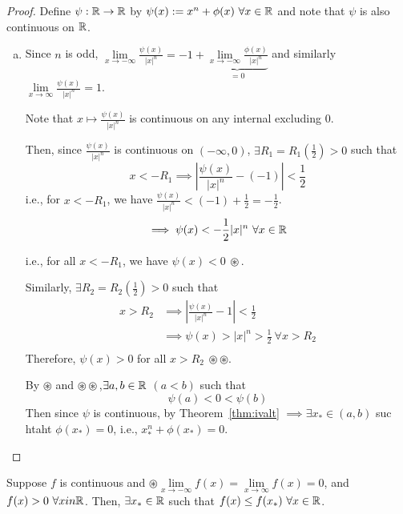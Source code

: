 \begin{proof}
    Define $\psi: \mathbb R \to \mathbb R$ by $\psi(x):= x^n + \phi(x)\ \forall x \in \RR$
    and note that $\psi$ is also continuous on $\mathbb R$.
    \begin{enumerate}[(a)]
        \item Since $n$ is odd, $\lim\limits_{x\to -\infty}\frac{\psi(x)}{|x|^n} = -1 + \underbrace{\lim\limits_{x \to -\infty} \frac{\phi(x)}{|x|^n}}_{=0}$
        and similarly $\lim\limits_{x\to \infty}\frac{\psi(x)}{|x|^n} = 1$.

        Note that $x \mapsto \frac{\psi(x)}{|x|^n}$ is continuous on any internal excluding 0. 

        Then, since $\frac{\psi(x)}{|x|^n}$ is continuous on $(-\infty, 0)$, $\exists R_1 = R_1(\frac{1}{2}) > 0$ such that
        $$x < -R_1 \implies \left|\frac{\psi(x)}{|x|^n} - (-1)\right| < \frac{1}{2}$$
        i.e., for $x < -R_1$, we have $\frac{\psi(x)}{|x|^n} < (-1) + \frac{1}{2} = -\frac{1}{2}$.
        $$\implies \psi(x) < -\frac{1}{2}|x|^n\ \forall x \in \RR$$

        i.e., for all $x < -R_1$, we have $\psi(x) < 0\ \circledast$.

        Similarly, $\exists R_2 = R_2(\frac{1}{2}) > 0$ such that 
        \begin{align*}
            x > R_2 &\implies \left|\frac{\psi(x)}{|x|^n}  - 1\right| < \frac{1}{2} \\
            &\implies \psi(x) > |x|^n > \frac{1}{2}\ \forall x > R_2 \\
        \end{align*}
        Therefore, $\psi(x) > 0$ for all $x > R_2\ \circledast \circledast $.

        By $\circledast$ and $\circledast \circledast$,$\exists a, b \in \mathbb R$ $(a < b)$ such that
        $$\psi(a) < 0 < \psi(b)$$ Then since $\psi$ is continuous, by Theorem~\ref{thm:ivalt}
        $\implies \exists x_* \in (a, b)$ suc htaht $\phi(x_*) = 0$, i.e., $x_*^n + \phi(x_*) = 0$.
    \end{enumerate}
\end{proof}

\begin{example}
    
\end{example}
\begin{example}
    
\end{example}
\begin{example}
    
\end{example}




\begin{example}
    Suppose $f$ is continuous and $\circledast \lim\limits_{x \to -\infty} f(x) = \lim\limits_{x \to \infty} f(x) = 0$, 
    and $f(x) > 0\ \forall x in \mathbb R$. Then, $\exists x_* \in \mathbb R$ such that $f(x) \leq f(x_*)\ \forall x \in \mathbb R$.
\end{example}